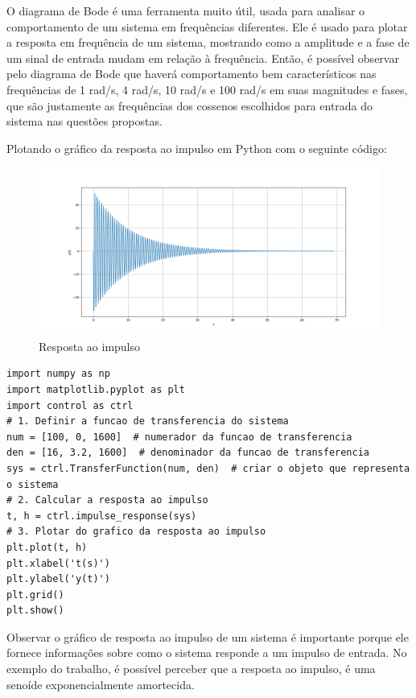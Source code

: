 \documentclass[10pt]{article}
\begin{document}
\quad O diagrama de Bode é uma ferramenta muito útil,
usada para analisar o comportamento de um sistema em frequências diferentes.
Ele é usado para plotar a resposta em frequência de um sistema,
mostrando como a amplitude e a fase de um sinal de entrada mudam em relação à frequência.
Então, é possível observar pelo diagrama de Bode que haverá comportamento bem característicos nas frequências de 1 rad/s,
4 rad/s, 10 rad/s e 100 rad/s em suas magnitudes e fases,
que são justamente as frequências dos cossenos escolhidos para entrada do sistema nas questões propostas.

\quad Plotando o gráfico da resposta ao impulso em Python com o seguinte código:

\begin{figure}[h]
    \centering
    \includegraphics[scale=0.4]{impulso.png}
    \caption{Resposta ao impulso}
\end{figure}

\begin{lstlisting}
import numpy as np
import matplotlib.pyplot as plt
import control as ctrl
# 1. Definir a funcao de transferencia do sistema
num = [100, 0, 1600]  # numerador da funcao de transferencia
den = [16, 3.2, 1600]  # denominador da funcao de transferencia
sys = ctrl.TransferFunction(num, den)  # criar o objeto que representa o sistema
# 2. Calcular a resposta ao impulso
t, h = ctrl.impulse_response(sys)
# 3. Plotar do grafico da resposta ao impulso
plt.plot(t, h)
plt.xlabel('t(s)')
plt.ylabel('y(t)')
plt.grid()
plt.show()
\end{lstlisting}

\quad Observar o gráfico de resposta ao impulso de um sistema é importante porque ele fornece informações sobre como o sistema responde a um impulso de entrada.
No exemplo do trabalho, é possível perceber que a resposta ao impulso, é uma senoíde exponencialmente amortecida.
\end{document}

